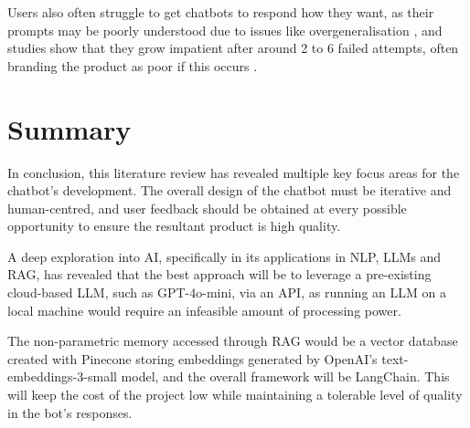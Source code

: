\documentclass[12pt]{report}
\begin{document}
    Users also often struggle to get chatbots to respond how they want, as their prompts may be poorly understood
    due to issues like overgeneralisation \autocite{zamfirescu-pereira_why_2023}, and studies show that they
    grow impatient after around 2 to 6 failed attempts, often branding the product as poor if this occurs \autocite{luger_like_2016}.

    \section{Summary}

    In conclusion, this literature review has revealed multiple key focus areas for the chatbot's development. 
    The overall design of the chatbot must be iterative and human-centred, and user feedback should 
    be obtained at every possible opportunity to ensure the resultant product is high quality.
    
    A deep exploration into AI, specifically in its applications in NLP, LLMs and RAG, has revealed that the best approach 
    will be to leverage a pre-existing cloud-based LLM, such as GPT-4o-mini, via an API, as running an LLM on a local machine would 
    require an infeasible amount of processing power.

    The non-parametric memory accessed through RAG would be a vector database created with Pinecone storing embeddings generated by OpenAI's text-embeddings-3-small 
    model, and the overall framework will be LangChain. This will keep the cost of the project low while maintaining a tolerable level of quality in the bot's responses.
\end{document}
